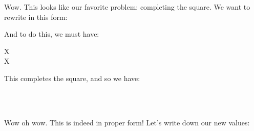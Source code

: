 Wow. This looks like our favorite problem: completing the square. We
want to rewrite in this form:

\begin{nedqn}
\end{nedqn}

And to do this, we must have:

\begin{nedqn}
  \vmux
  \parensqrt{
    \covmtxmux\invx + \covmtxx\invx
  }
  X
\eqcol
  \vmux\tran
  \parens{
    \covmtxmux\invx \vmux
    +
    \covmtxx\invx \vx
  }
\\
  X
\eqcol
  \parensnegsqrt{
    \covmtxmux\invx + \covmtxx\invx
  }
  \vmux\invx
  \vmux\tran
  \parens{
    \covmtxmux\invx \vmux
    +
    \covmtxx\invx \vx
  }
\\
\eqcol
  \parensnegsqrt{
    \covmtxmux\invx + \covmtxx\invx
  }
  \parens{
    \covmtxmux\invx \vmux
    +
    \covmtxx\invx \vx
  }
\end{nedqn}

This completes the square, and so we have:

\begin{nedqn}
  \log \cpvmuxx
\simcol
  \\
\eqcol
  \normsq{
    \parensqrt{
      \covmtxmux\invx + \covmtxx\invx
    }
    \vmux
    -
    {
      \parensnegsqrt{
        \covmtxmux\invx + \covmtxx\invx
      }
      \parens{
        \covmtxmux\invx \vmux
        +
        \covmtxx\invx \vx
      }
    }
  }
\\
\eqcol
  \normsq{
    \parensqrt{
      \covmtxmux\invx + \covmtxx\invx
    }
    \sqbrackets{
      \vmux
      -
      {
        \parensinv{
          \covmtxmux\invx + \covmtxx\invx
        }
        \parens{
          \covmtxmux\invx \vmux
          +
          \covmtxx\invx \vx
        }
      }
    }
  }
\end{nedqn}

Wow oh wow. This is indeed in proper form! Let's write down our new
values:

\begin{nedqn}
  \covmtxp\subvmux
\eqcol
  \parensinv{
    \covmtxmux\invx
    +
    \covmtxx\invx
  }
\\
  \vmumuxp
\eqcol
  \covmtxp\subvmux
  \parens{
    \covmtxmux\invx \vmux
    +
    \covmtxx\invx \vx
  }
\end{nedqn}



